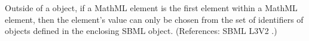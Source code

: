 Outside of a \FunctionDefinition object, if a MathML  element is
the first element within a MathML  element, then the
 element's value can only be chosen from the set of identifiers
of \FunctionDefinition{} objects defined in the enclosing SBML \Model
object.  (References: SBML L3V2
.)
